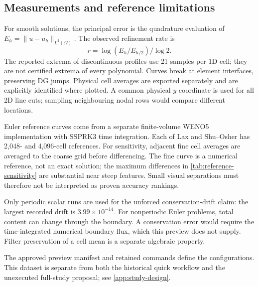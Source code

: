 \subsection{Measurements and reference limitations}
For smooth solutions, the principal error is the quadrature evaluation of
$E_h=\|u-u_h\|_{L^2(\Omega)}$. The observed refinement rate is
\begin{equation}
 r=\log(E_h/E_{h/2})/\log 2.\label{eq:observed-rate}
\end{equation}
The reported extrema of discontinuous profiles use 21 samples per 1D cell;
they are not certified extrema of every polynomial. Curves break at element
interfaces, preserving DG jumps. Physical cell averages are exported separately
and are explicitly identified where plotted. A common physical $y$ coordinate
is used for all 2D line cuts; sampling neighbouring nodal rows would compare
different locations.

Euler reference curves come from a separate finite-volume WENO5 implementation
with SSPRK3 time integration. Each of Lax and Shu--Osher has 2,048- and
4,096-cell references. For sensitivity, adjacent fine cell averages are averaged
to the coarse grid before differencing. The fine curve is a numerical reference,
not an exact solution; the maximum differences in \cref{tab:reference-sensitivity}
are substantial near steep features. Small visual separations must therefore
not be interpreted as proven accuracy rankings.

Only periodic scalar runs are used for the unforced conservation-drift claim:
the largest recorded drift is $3.99\times10^{-14}$. For nonperiodic Euler problems,
total content can change through the boundary. A conservation error would
require the time-integrated numerical boundary flux, which this preview does
not supply. Filter preservation of a cell mean is a separate algebraic property.

The approved preview manifest and retained commands define the configurations.
This dataset is separate from both the historical quick workflow and the
unexecuted full-study proposal; see \cref{app:study-design}.
